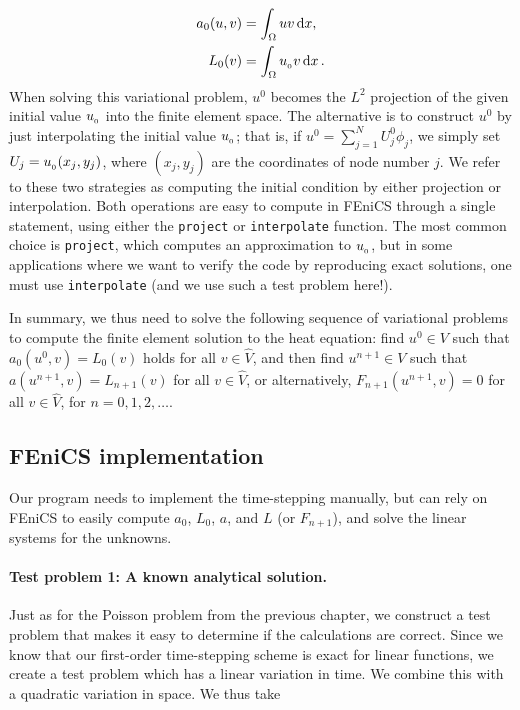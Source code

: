 \documentclass[graybox,envcountchap,sectrefs,final]{svmonodo}
\begin{document}
\begin{align}
a_0(u,v) &= \int_\Omega uv \dx, \label{ch:diffusion0:pde1:a0}\\
L_0(v) &= \int_\Omega \uI v \dx\tp \label{ch:diffusion0:pde1:L0}
\end{align}
When solving this variational problem, $u^0$ becomes the $L^2$
projection of the given initial value $\uI$ into the finite element
space. The alternative is to construct $u^0$ by just interpolating the
initial value $\uI$; that is, if $u^0=\sum_{j=1}^N U^0_j\phi_j$, we
simply set $U_j=\uI(x_j,y_j)$, where $(x_j,y_j)$ are the coordinates
of node number $j$. We refer to these two strategies as computing the
initial condition by either projection or interpolation. Both
operations are easy to compute in FEniCS through a single statement,
using either the \texttt{project} or \texttt{interpolate} function. The most common
choice is \texttt{project}, which computes an approximation to $\uI$, but in
some applications where we want to verify the code by reproducing
exact solutions, one must use \texttt{interpolate} (and we use such a test
problem here!).


In summary, we thus need to solve the following sequence of variational
problems to compute the finite element solution to the heat equation:
find $u^0\in V$ such that $a_0(u^0,v)=L_0(v)$ holds for all $v\in\hat V$,
and then find $u^{n+1}\in V$
such that $a(u^{n+1},v)=L_{n+1}(v)$ for all $v\in\hat V$,
or alternatively, $F_{n+1}(u^{n+1},v)=0$ for all $v\in\hat V$,
for $n=0,1,2,\ldots$.

\subsection{FEniCS implementation}
\label{ftut:timedep:diffusion1:impl}

Our program needs to implement the time-stepping manually, but can
rely on FEniCS to easily compute $a_0$, $L_0$, $a$, and $L$ (or
$F_{n+1}$), and solve the linear systems for the unknowns.

\paragraph{Test problem 1: A known analytical solution.}
Just as for the Poisson problem from the previous chapter, we
construct a test problem that makes it easy to determine if the
calculations are correct. Since we know that our first-order
time-stepping scheme is exact for linear functions, we create a test
problem which has a linear variation in time. We combine this with a
quadratic variation in space. We thus take
\end{document}

